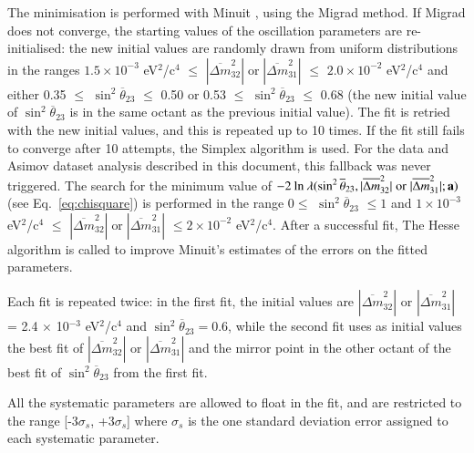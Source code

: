 The minimisation is performed with Minuit \cite{Minuit}, using the Migrad method.
If Migrad does not converge, the starting values of the oscillation parameters are re-initialised:
the new initial values are randomly drawn from uniform distributions in the ranges 
$1.5 \times 10^{-3}$ eV$^{2}$/c$^{4}$ $\leq$ $|\overline{\Delta m}^{2}_{32}| \; \textrm{or} \; |\overline{\Delta m}^{2}_{31}|$ $\leq$ $2.0 \times 10^{-2}$  
eV$^{2}$/c$^{4}$ and either 0.35 $\leq$ $\sin^{2}\overline{\theta}_{23}$ $\leq$ 0.50 or 0.53 
$\leq$ $\sin^{2}\overline{\theta}_{23}$ $\leq$ 0.68 (the new initial value of 
$\sin^{2}\overline{\theta}_{23}$ is in the same octant as the previous initial value).  
The fit is retried with the new initial values, and this is repeated up to 10 times.
If the fit still fails to converge after 10 attempts, the Simplex algorithm is used.
For the data and Asimov dataset analysis described in this document, this fallback was never triggered.
The search for the minimum value of 
$-2 \: \textrm{ln} \: \lambda(\sin^{2}\overline{\theta}_{23},|\overline{\Delta m}^ {2}_{32}| \; \textrm{or} \; |\overline{\Delta m}^{2}_{31}|; {\bf a})$ (see Eq.~\ref{eq:chisquare}) 
is performed in the range 
$0 \leq$ $\sin^{2}\overline{\theta}_{23}$ $\leq 1$ and
$1 \times 10^{-3}$ eV$^{2}$/c$^{4}$ $\leq$ $|\overline{\Delta m}^{2}_{32}| \; \textrm{or} \; |\overline{\Delta m}^{2}_{31}|$ $\leq 2 \times 10^{-2}$ eV$^{2}$/c$^{4}$. 
After a successful fit, The Hesse algorithm is called to improve Minuit's estimates of the errors on the fitted parameters.

Each fit is repeated twice: in the first fit, the initial values are $|\overline{\Delta m}^{2}_{32}|$ 
or $|\overline{\Delta m}^{2}_{31}|$ 
= 2.4 $\times$ 10$^{-3}$ 
eV$^{2}$/c$^{4}$ and $\sin^{2}\overline{\theta}_{23} = 0.6$, while the second fit uses as initial values the best fit of $|\overline{\Delta m}^{2}_{32}|$ 
or $|\overline{\Delta m}^{2}_{31}|$ 
and the mirror point in the other octant of the best fit of $\sin^{2}\overline{\theta}_{23}$ from the first fit. 

All the systematic parameters are allowed to float in the fit, and are restricted to the range [-3$\sigma_{s}$, +3$\sigma_{s}$]
where $\sigma_{s}$ is the one standard deviation error assigned to each systematic parameter.

